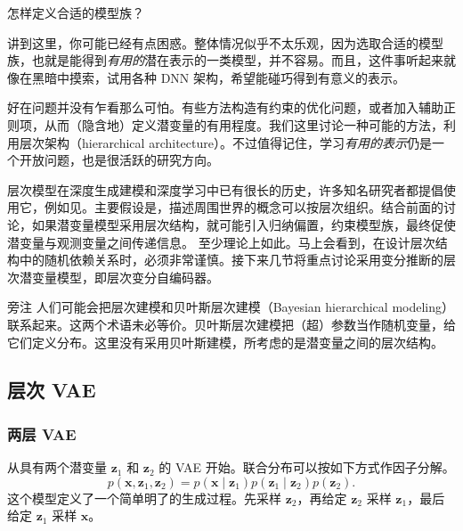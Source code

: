 \medskip\noindent 怎样定义合适的模型族？\par\smallskip
讲到这里，你可能已经有点困惑。整体情况似乎不太乐观，因为选取合适的模型族，也就是能得到\emph{有用的}潜在表示的一类模型，并不容易。而且，这件事听起来就像在黑暗中摸索，试用各种 DNN 架构，希望能碰巧得到有意义的表示。

好在问题并没有乍看那么可怕。有些方法构造有约束的优化问题，或者加入辅助正则项，从而（隐含地）定义潜变量的有用程度。我们这里讨论一种可能的方法，利用层次架构（hierarchical architecture）。不过值得记住，学习\emph{有用的表示}仍是一个开放问题，也是很活跃的研究方向。

层次模型在深度生成建模和深度学习中已有很长的历史，许多知名研究者都提倡使用它，例如见。主要假设是，描述周围世界的概念可以按层次组织。结合前面的讨论，如果潜变量模型采用层次结构，就可能引入归纳偏置，约束模型族，最终促使潜变量与观测变量之间传递信息。
至少理论上如此。马上会看到，在设计层次结构中的随机依赖关系时，必须非常谨慎。接下来几节将重点讨论采用变分推断的层次潜变量模型，即层次变分自编码器。

\begin{booknote}{旁注}
人们可能会把层次建模和贝叶斯层次建模（Bayesian hierarchical modeling）联系起来。这两个术语未必等价。贝叶斯层次建模把（超）参数当作随机变量，给它们定义分布。这里没有采用贝叶斯建模，所考虑的是潜变量之间的层次结构。
\end{booknote}

\subsection{层次 VAE}
\subsubsection{两层 VAE}
从具有两个潜变量 $\mathbf{z}_1$ 和 $\mathbf{z}_2$ 的 VAE 开始。联合分布可以按如下方式作因子分解。
\begin{equation}
p(\mathbf{x},\mathbf{z}_1,\mathbf{z}_2)=p(\mathbf{x}\mid\mathbf{z}_1)p(\mathbf{z}_1\mid\mathbf{z}_2)p(\mathbf{z}_2).
\tag{5.75}\label{eq:05-75}
\end{equation}
这个模型定义了一个简单明了的生成过程。先采样 $\mathbf{z}_2$，再给定 $\mathbf{z}_2$ 采样 $\mathbf{z}_1$，最后给定 $\mathbf{z}_1$ 采样 $\mathbf{x}$。

